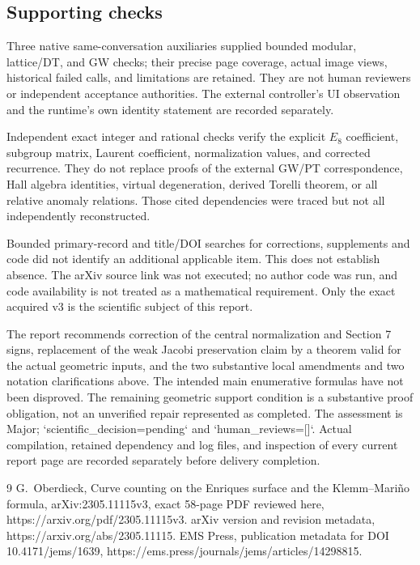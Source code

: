 \documentclass[10pt]{article}
\begin{document}
\subsection*{Supporting checks}
Three native same-conversation auxiliaries supplied bounded modular, lattice/DT, and GW checks; their precise page coverage, actual image views, historical failed calls, and limitations are retained. They are not human reviewers or independent acceptance authorities. The external controller’s UI observation and the runtime’s own identity statement are recorded separately.\par
Independent exact integer and rational checks verify the explicit \(E_8\) coefficient, subgroup matrix, Laurent coefficient, normalization values, and corrected recurrence. They do not replace proofs of the external GW/PT correspondence, Hall algebra identities, virtual degeneration, derived Torelli theorem, or all relative anomaly relations. Those cited dependencies were traced but not all independently reconstructed.\par
Bounded primary-record and title/DOI searches for corrections, supplements and code did not identify an additional applicable item. This does not establish absence. The arXiv source link was not executed; no author code was run, and code availability is not treated as a mathematical requirement. Only the exact acquired v3 is the scientific subject of this report.\par
The report recommends correction of the central normalization and Section 7 signs, replacement of the weak Jacobi preservation claim by a theorem valid for the actual geometric inputs, and the two substantive local amendments and two notation clarifications above. The intended main enumerative formulas have not been disproved. The remaining geometric support condition is a substantive proof obligation, not an unverified repair represented as completed. The assessment is Major; `scientific\_decision=pending` and `human\_reviews=[]`. Actual compilation, retained dependency and log files, and inspection of every current report page are recorded separately before delivery completion.\par
9 G. Oberdieck, Curve counting on the Enriques surface and the Klemm–Mariño formula, arXiv:2305.11115v3, exact 58-page PDF reviewed here, https://arxiv.org/pdf/2305.11115v3. arXiv version and revision metadata, https://arxiv.org/abs/2305.11115. EMS Press, publication metadata for DOI 10.4171/jems/1639, https://ems.press/journals/jems/articles/14298815.\par
\end{document}
